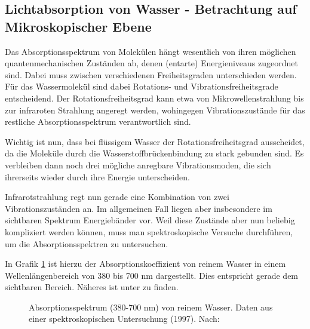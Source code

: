 \documentclass[12pt,a4paper,titlepage,headinclude,bibtotoc]{scrartcl}
\numberwithin{equation}{subsection}
\begin{document}
\subsection{Lichtabsorption von Wasser - Betrachtung auf Mikroskopischer Ebene}
\label{sec:absorblicht}
Das Absorptionsspektrum von Molekülen hängt wesentlich von ihren möglichen 
quantenmechanischen Zuständen ab, denen (entarte) Energieniveaus zugeordnet sind. Dabei muss zwischen verschiedenen Freiheitsgraden
unterschieden werden.
Für das Wassermolekül sind dabei Rotations- und Vibrationsfreiheitsgrade entscheidend.
Der Rotationsfreiheitsgrad kann etwa von Mikrowellenstrahlung bis zur infraroten Strahlung angeregt werden, wohingegen Vibrationszustände für das restliche Absorptionsspektrum verantwortlich sind.


Wichtig ist nun, dass bei flüssigem Wasser der Rotationsfreiheitsgrad ausscheidet, da die Moleküle durch die Wasserstoffbrückenbindung zu stark gebunden sind.
Es verbleiben dann noch drei mögliche anregbare Vibrationsmoden, die sich ihrerseits wieder durch ihre Energie unterscheiden.

Infrarotstrahlung regt nun gerade eine Kombination von zwei Vibrationszuständen an.
Im allgemeinen Fall liegen aber insbesondere im sichtbaren Spektrum Energiebänder vor.
Weil diese Zustände aber nun beliebig kompliziert werden können, muss man spektroskopische Versuche durchführen, um die Absorptionsspektren zu untersuchen.

In Grafik \ref{fig:abs} ist hierzu der Absorptionskoeffizient von reinem Wasser in einem Wellenlängenbereich von 380 bis 700 nm dargestellt.
Dies entspricht gerade dem sichtbaren Bereich.
Näheres ist unter \cite{abs} zu finden.

\begin{figure}[h]
	\centering
	
	\caption{Absorptionsspektrum (380-700 $\si{\nano \metre}$) von reinem Wasser. Daten aus einer spektroskopischen Untersuchung (1997). Nach: \cite{speck}}
	\label{fig:abs}
\end{figure}
\end{document}
